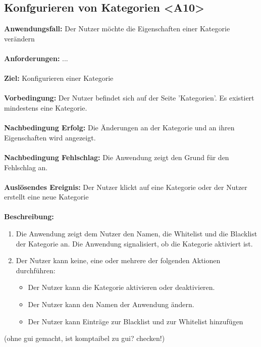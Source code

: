 \documentclass[parskip=full]{scrartcl} %
\begin{document}
\subsection*{Konfgurieren von Kategorien <A10>}
\textbf{Anwendungsfall:} Der Nutzer möchte die Eigenschaften einer Kategorie verändern\\\\
\textbf{Anforderungen:} ...\\\\
\textbf{Ziel:} Konfigurieren einer Kategorie \\\\
\textbf{Vorbedingung:} Der Nutzer befindet sich auf der Seite 'Kategorien'. Es existiert mindestens eine Kategorie.\\\\
\textbf{Nachbedingung Erfolg:} Die Änderungen an der Kategorie und an ihren Eigenschaften wird angezeigt. \\\\
\textbf{Nachbedingung Fehlschlag:} Die Anwendung zeigt den Grund für den Fehlschlag an. \\\\
\textbf{Auslösendes Ereignis:} Der Nutzer klickt auf eine Kategorie oder der Nutzer erstellt eine neue Kategorie \\\\
\textbf{Beschreibung:}
\begin{enumerate}
    \item Die Anwendung zeigt dem Nutzer den Namen, die Whitelist und die Blacklist der Kategorie an. Die Anwendung signalisiert, ob die Kategorie aktiviert ist.
    \item Der Nutzer kann keine, eine oder mehrere der folgenden Aktionen durchführen:
    \begin{itemize}
        \item Der Nutzer kann die Kategorie aktivieren oder deaktivieren.
        \item Der Nutzer kann den Namen der Anwendung ändern.
        \item Der Nutzer kann Einträge zur Blacklist und zur Whitelist hinzufügen
    \end{itemize}
\end{enumerate}
\newpage

(ohne gui gemacht, ist komptaibel zu gui? checken!)
\end{document}
